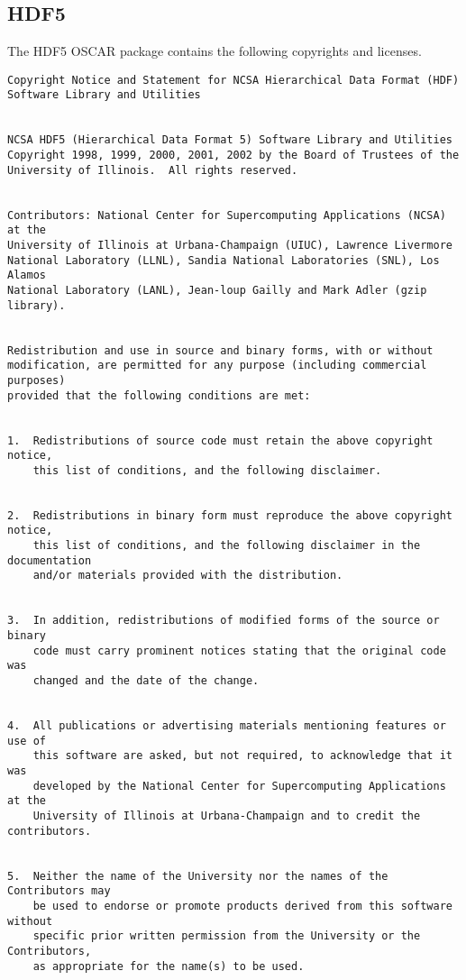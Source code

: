 %
%
%

\subsection{HDF5}

The HDF5 OSCAR package contains the following copyrights and
licenses.

\begin{verbatim}
Copyright Notice and Statement for NCSA Hierarchical Data Format (HDF)
Software Library and Utilities


NCSA HDF5 (Hierarchical Data Format 5) Software Library and Utilities 
Copyright 1998, 1999, 2000, 2001, 2002 by the Board of Trustees of the 
University of Illinois.  All rights reserved.


Contributors: National Center for Supercomputing Applications (NCSA) at the
University of Illinois at Urbana-Champaign (UIUC), Lawrence Livermore 
National Laboratory (LLNL), Sandia National Laboratories (SNL), Los Alamos 
National Laboratory (LANL), Jean-loup Gailly and Mark Adler (gzip library).


Redistribution and use in source and binary forms, with or without
modification, are permitted for any purpose (including commercial purposes)
provided that the following conditions are met:


1.  Redistributions of source code must retain the above copyright notice,
    this list of conditions, and the following disclaimer.


2.  Redistributions in binary form must reproduce the above copyright notice,
    this list of conditions, and the following disclaimer in the documentation
    and/or materials provided with the distribution.


3.  In addition, redistributions of modified forms of the source or binary
    code must carry prominent notices stating that the original code was
    changed and the date of the change.


4.  All publications or advertising materials mentioning features or use of
    this software are asked, but not required, to acknowledge that it was 
    developed by the National Center for Supercomputing Applications at the 
    University of Illinois at Urbana-Champaign and to credit the contributors.


5.  Neither the name of the University nor the names of the Contributors may
    be used to endorse or promote products derived from this software without
    specific prior written permission from the University or the Contributors,
    as appropriate for the name(s) to be used.



\end{verbatim}

